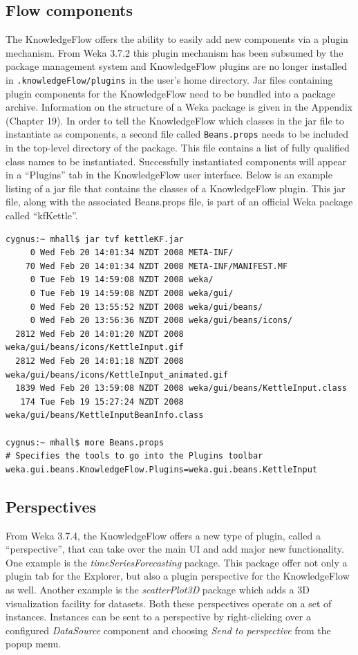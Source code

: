 \subsection{Flow components}
The KnowledgeFlow offers the ability to easily add new components via
a plugin mechanism. From Weka 3.7.2 this plugin mechanism has been
subsumed by the package management system and KnowledgeFlow plugins
are no longer installed in \verb=.knowledgeFlow/plugins= in the user's
home directory. Jar files containing plugin components for the
KnowledgeFlow need to be bundled into a package archive. Information
on the structure of a Weka package is given in the Appendix (Chapter
19). In order to tell the KnowledgeFlow which classes in the jar file
to instantiate as components, a second file called \verb=Beans.props=
needs to be included in the top-level directory of the package. This
file contains a list of fully qualified class names to be
instantiated. Successfully instantiated components will appear in a
``Plugins'' tab in the KnowledgeFlow user interface. Below is an
example listing of a jar file that contains the classes of a
KnowledgeFlow plugin. This jar file, along with the associated
Beans.props file, is part of an official Weka package called
``kfKettle''.

\begin{verbatim}
cygnus:~ mhall$ jar tvf kettleKF.jar 
     0 Wed Feb 20 14:01:34 NZDT 2008 META-INF/
    70 Wed Feb 20 14:01:34 NZDT 2008 META-INF/MANIFEST.MF
     0 Tue Feb 19 14:59:08 NZDT 2008 weka/
     0 Tue Feb 19 14:59:08 NZDT 2008 weka/gui/
     0 Wed Feb 20 13:55:52 NZDT 2008 weka/gui/beans/
     0 Wed Feb 20 13:56:36 NZDT 2008 weka/gui/beans/icons/
  2812 Wed Feb 20 14:01:20 NZDT 2008 weka/gui/beans/icons/KettleInput.gif
  2812 Wed Feb 20 14:01:18 NZDT 2008 weka/gui/beans/icons/KettleInput_animated.gif
  1839 Wed Feb 20 13:59:08 NZDT 2008 weka/gui/beans/KettleInput.class
   174 Tue Feb 19 15:27:24 NZDT 2008 weka/gui/beans/KettleInputBeanInfo.class

cygnus:~ mhall$ more Beans.props 
# Specifies the tools to go into the Plugins toolbar
weka.gui.beans.KnowledgeFlow.Plugins=weka.gui.beans.KettleInput
\end{verbatim}

\subsection{Perspectives}
From Weka 3.7.4, the KnowledgeFlow offers a new type of plugin, called
a ``perspective'', that can take over the main UI and add major new
functionality. One example is the \textit{timeSeriesForecasting}
package. This package offer not only a plugin tab for the Explorer,
but also a plugin perspective for the KnowledgeFlow as well. Another
example is the \textit{scatterPlot3D} package which adds a 3D
visualization facility for datasets. Both these perspectives operate
on a set of instances. Instances can be sent to a perspective by
right-clicking over a configured \textit{DataSource} component and
choosing \textit{Send to perspective} from the popup menu.

